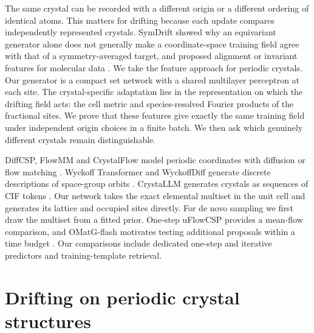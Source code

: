\documentclass[10pt]{article}
\begin{document}
The same crystal can be recorded with a different origin or a different ordering of identical atoms. This matters for drifting because each update compares independently represented crystals. SymDrift showed why an equivariant generator alone does not generally make a coordinate-space training field agree with that of a symmetry-averaged target, and proposed alignment or invariant features for molecular data \cite{symdrift}. We take the feature approach for periodic crystals. Our generator is a compact set network with a shared multilayer perceptron at each site. The crystal-specific adaptation lies in the representation on which the drifting field acts: the cell metric and species-resolved Fourier products of the fractional sites. We prove that these features give exactly the same training field under independent origin choices in a finite batch. We then ask which genuinely different crystals remain distinguishable.

DiffCSP, FlowMM and CrystalFlow model periodic coordinates with diffusion or flow matching \cite{diffcsp,flowmm,crystalflow}. Wyckoff Transformer and WyckoffDiff generate discrete descriptions of space-group orbits \cite{wyformer,wyckoff}. CrystaLLM generates crystals as sequences of CIF tokens \cite{crystallm}. Our network takes the exact elemental multiset in the unit cell and generates its lattice and occupied sites directly. For de novo sampling we first draw the multiset from a fitted prior. One-step uFlowCSP provides a mean-flow comparison, and OMatG-flash motivates testing additional proposals within a time budget \cite{uflow,omatg}. Our comparisons include dedicated one-step and iterative predictors and training-template retrieval.

\section{Drifting on periodic crystal structures}\label{sec:periodic-drift}
\end{document}
